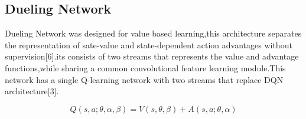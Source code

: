 






\subsection{Dueling Network}

Dueling Network was designed for  value based learning,this architecture separates the representation of sate-value and state-dependent action advantages without supervision[6].its consists of two streams that represents the value and advantage functions,while sharing a common convolutional feature learning module.This network has a single Q-learning network with two streams that replace DQN architecture[3]. 

\begin{equation}
    Q(s,a; \theta,\alpha,\beta) = V(s,\theta,\beta) + A(s,a; \theta,\alpha)
\end{equation}

